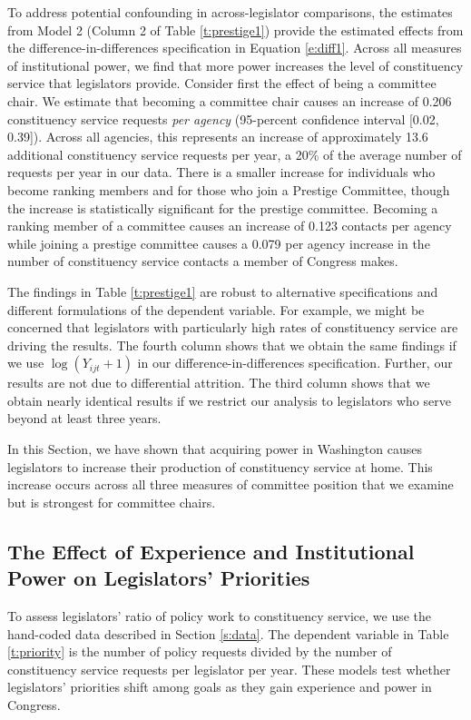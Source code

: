 \documentclass[12pt]{article}
\begin{document}
To address potential confounding in across-legislator comparisons, the estimates from Model 2 (Column 2 of Table \ref{t:prestige1}) provide the estimated effects from the difference-in-differences specification in Equation \ref{e:diff1}. Across all measures of institutional power, we find that more power increases the level of constituency service that legislators provide. Consider first the effect of being a committee chair. We estimate that becoming a committee chair causes an increase of 0.206 constituency service requests \textit{per agency} (95-percent confidence interval [0.02, 0.39]). Across all agencies, this represents an increase of approximately 13.6 additional constituency service requests per year, a 20\% of the average number of requests per year in our data. There is a smaller increase for individuals who become ranking members and for those who join a Prestige Committee, though the increase is statistically significant for the prestige committee. Becoming a ranking member of a committee causes an increase of 0.123 contacts per agency while joining a prestige committee causes a 0.079 per agency increase in the number of constituency service contacts a member of Congress makes.

The findings in Table \ref{t:prestige1} are robust to alternative specifications and different formulations of the dependent variable. For example, we might be concerned that legislators with particularly high rates of constituency service are driving the results. The fourth column shows that we obtain the same findings if we use $\log (Y_{ijt} + 1)$ in our difference-in-differences specification. Further, our results are not due to differential attrition. The third column shows that we obtain nearly identical results if we restrict our analysis to legislators who serve beyond at least three years.    

In this Section, we have shown that acquiring power in Washington causes legislators to increase their production of constituency service at home. This increase occurs across all three measures of committee position that we examine but is strongest for committee chairs. 


\subsection{The Effect of Experience and Institutional Power on Legislators' Priorities}\label{s:priority} 
To assess legislators' ratio of policy work to constituency service, we use the hand-coded data described in Section \ref{s:data}. The dependent variable in Table \ref{t:priority} is the number of policy requests divided by the number of constituency service requests per legislator per year. These models test whether legislators' priorities shift among goals as they gain experience and power in Congress.
\end{document}
